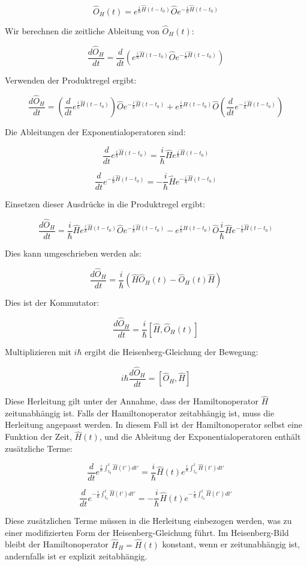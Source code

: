 \documentclass[11pt,a4paper]{article}
\begin{document}
\[
\hat{O}_H(t) = e^{\frac{i}{\hbar} \hat{H}(t-t_0)} \hat{O} e^{-\frac{i}{\hbar} \hat{H}(t-t_0)}
\]

Wir berechnen die zeitliche Ableitung von \(\hat{O}_H(t)\):

\[
\frac{d \hat{O}_H}{d t} = \frac{d}{d t} \left( e^{\frac{i}{\hbar} \hat{H}(t-t_0)} \hat{O} e^{-\frac{i}{\hbar} \hat{H}(t-t_0)} \right)
\]

Verwenden der Produktregel ergibt:

\[
\frac{d \hat{O}_H}{d t} = \left( \frac{d}{d t} e^{\frac{i}{\hbar} \hat{H}(t-t_0)} \right) \hat{O} e^{-\frac{i}{\hbar} \hat{H}(t-t_0)} + e^{\frac{i}{\hbar} \hat{H}(t-t_0)} \hat{O} \left( \frac{d}{d t} e^{-\frac{i}{\hbar} \hat{H}(t-t_0)} \right)
\]

Die Ableitungen der Exponentialoperatoren sind:

\[
\frac{d}{d t} e^{\frac{i}{\hbar} \hat{H}(t-t_0)} = \frac{i}{\hbar} \hat{H} e^{\frac{i}{\hbar} \hat{H}(t-t_0)}
\]

\[
\frac{d}{d t} e^{-\frac{i}{\hbar} \hat{H}(t-t_0)} = -\frac{i}{\hbar} \hat{H} e^{-\frac{i}{\hbar} \hat{H}(t-t_0)}
\]

Einsetzen dieser Ausdrücke in die Produktregel ergibt:

\[
\frac{d \hat{O}_H}{d t} = \frac{i}{\hbar} \hat{H} e^{\frac{i}{\hbar} \hat{H}(t-t_0)} \hat{O} e^{-\frac{i}{\hbar} \hat{H}(t-t_0)} - e^{\frac{i}{\hbar} \hat{H}(t-t_0)} \hat{O} \frac{i}{\hbar} \hat{H} e^{-\frac{i}{\hbar} \hat{H}(t-t_0)}
\]

Dies kann umgeschrieben werden als:

\[
\frac{d \hat{O}_H}{d t} = \frac{i}{\hbar} \left( \hat{H} \hat{O}_H(t) - \hat{O}_H(t) \hat{H} \right)
\]

Dies ist der Kommutator:

\[
\frac{d \hat{O}_H}{d t} = \frac{i}{\hbar} [\hat{H}, \hat{O}_H(t)]
\]

Multiplizieren mit \(i \hbar\) ergibt die Heisenberg-Gleichung der Bewegung:

\[
i \hbar \frac{d \hat{O}_H}{d t} = [\hat{O}_H, \hat{H}]
\]

Diese Herleitung gilt unter der Annahme, dass der Hamiltonoperator \(\hat{H}\) zeitunabhängig ist. Falls der Hamiltonoperator zeitabhängig ist, muss die Herleitung angepasst werden. In diesem Fall ist der Hamiltonoperator selbst eine Funktion der Zeit, \(\hat{H}(t)\), und die Ableitung der Exponentialoperatoren enthält zusätzliche Terme:

\[
\frac{d}{d t} e^{\frac{i}{\hbar} \int_{t_0}^{t} \hat{H}(t') dt'} = \frac{i}{\hbar} \hat{H}(t) e^{\frac{i}{\hbar} \int_{t_0}^{t} \hat{H}(t') dt'}
\]

\[
\frac{d}{d t} e^{-\frac{i}{\hbar} \int_{t_0}^{t} \hat{H}(t') dt'} = -\frac{i}{\hbar} \hat{H}(t) e^{-\frac{i}{\hbar} \int_{t_0}^{t} \hat{H}(t') dt'}
\]

Diese zusätzlichen Terme müssen in die Herleitung einbezogen werden, was zu einer modifizierten Form der Heisenberg-Gleichung führt. Im Heisenberg-Bild bleibt der Hamiltonoperator \(\hat{H}_H = \hat{H}(t)\) konstant, wenn er zeitunabhängig ist, andernfalls ist er explizit zeitabhängig.
\end{document}
